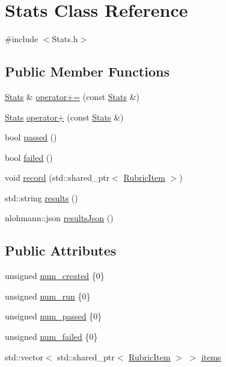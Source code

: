 \hypertarget{class_stats}{}\section{Stats Class Reference}
\label{class_stats}


{\ttfamily \#include $<$Stats.\+h$>$}

\subsection*{Public Member Functions}
\begin{DoxyCompactItemize}
\item 
\hyperlink{class_stats}{Stats} \& \hyperlink{class_stats_a40fa54dfb9b36d73bd77c5db4b294a79}{operator+=} (const \hyperlink{class_stats}{Stats} \&)
\item 
\hyperlink{class_stats}{Stats} \hyperlink{class_stats_a32ab6b479ad79fe923e2264e09080806}{operator+} (const \hyperlink{class_stats}{Stats} \&)
\item 
bool \hyperlink{class_stats_aeadd76aff06c7e684370251d2e75abf3}{passed} ()
\item 
bool \hyperlink{class_stats_afa92b4d8fa48ee7cd6e349ae6a5bf539}{failed} ()
\item 
void \hyperlink{class_stats_ad80ca89a4ce1578b41d0b64b873457af}{record} (std\+::shared\+\_\+ptr$<$ \hyperlink{class_rubric_item}{Rubric\+Item} $>$)
\item 
std\+::string \hyperlink{class_stats_a0c05e0e2304a9ac271fc0e95493c9aeb}{results} ()
\item 
nlohmann\+::json \hyperlink{class_stats_a6d0361dcb25186d1d168009a66cb675d}{results\+Json} ()
\end{DoxyCompactItemize}
\subsection*{Public Attributes}
\begin{DoxyCompactItemize}
\item 
unsigned \hyperlink{class_stats_aae6907517029159a56582d4050d37ba9}{num\+\_\+created} \{0\}
\item 
unsigned \hyperlink{class_stats_aad4b62381ae2f53d8449ed2adda1f112}{num\+\_\+run} \{0\}
\item 
unsigned \hyperlink{class_stats_a23aed2b3b568c55072f0bbf67cb98766}{num\+\_\+passed} \{0\}
\item 
unsigned \hyperlink{class_stats_a157cacc8bc1d42348107d4beb98bb0bf}{num\+\_\+failed} \{0\}
\item 
std\+::vector$<$ std\+::shared\+\_\+ptr$<$ \hyperlink{class_rubric_item}{Rubric\+Item} $>$ $>$ \hyperlink{class_stats_a07121ba8a0b750122d182cbb782b9658}{items}
\end{DoxyCompactItemize}


